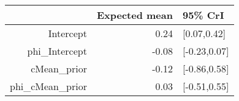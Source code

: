 \begin{tabular}{rrl}
  \hline
 & Expected mean & 95\% CrI \\ 
  \hline
Intercept & 0.24 & [0.07,0.42] \\ 
  phi\_Intercept & -0.08 & [-0.23,0.07] \\ 
  cMean\_prior & -0.12 & [-0.86,0.58] \\ 
  phi\_cMean\_prior & 0.03 & [-0.51,0.55] \\ 
   \hline
\end{tabular}

